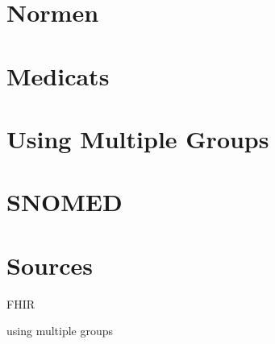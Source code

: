 



\section{Normen}

\section{Medicats}

\section{Using Multiple Groups}

\section{SNOMED}

\section{Sources}

FHIR \citep{braunstein2022health}

using multiple groups \citep{saripalle2019representing}





